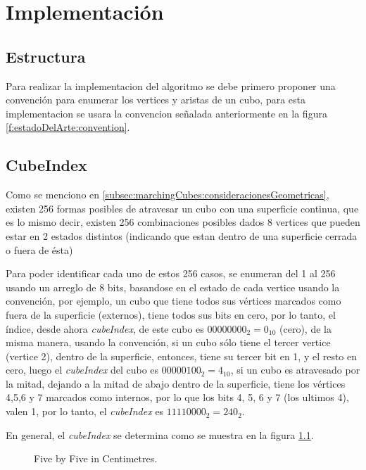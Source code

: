 \chapter{Implementación}
\label{ch:implementacion}

\section{Estructura}
\label{ch:implementacion:sec:estructura}

Para realizar la implementacion del algoritmo se debe primero proponer una convención para enumerar los vertices y aristas de un cubo, para esta implementacion se usara la convencion señalada anteriormente en la figura \ref{f:estadoDelArte:convention}.

\section{CubeIndex}
\label{ch:implementacion:sec:CubeIndex}

Como se menciono en \ref{subsec:marchingCubes:consideracionesGeometricas}, existen 256 formas posibles de atravesar un cubo con una superficie continua, que es lo mismo decir, existen 256 combinaciones posibles dados 8 vertices que pueden estar en 2 estados distintos (indicando que estan dentro de una superficie cerrada o fuera de ésta)

Para poder identificar cada uno de estos 256 casos, se enumeran del 1 al 256 usando un arreglo de 8 bits, basandose en el estado de cada vertice usando la convención, por ejemplo, un cubo que tiene todos sus vértices marcados como fuera de la superficie (externos), tiene todos sus bits en cero, por lo tanto, el índice, desde ahora \emph{cubeIndex}, de este cubo es $0000 0000_{2} = 0_{10}$ (cero), de la misma manera, usando la convención, si un cubo sólo tiene el tercer vertice (vertice 2), dentro de la superficie, entonces, tiene su tercer bit en 1, y el resto en cero, luego el \emph{cubeIndex} del cubo es $0000 0100_{2} = 4_{10}$, si un cubo es atravesado por la mitad, dejando a la mitad de abajo dentro de la superficie, tiene los vértices 4,5,6 y 7 
marcados como internos, por lo que los bits 4, 5, 6 y 7 (los ultimos 4), valen 1, por lo tanto, el \emph{cubeIndex} es $1111 0000_{2} = 240_{2}$.

En general, el \emph{cubeIndex} se determina como se muestra en la figura \ref{f:ch:implementacion:sec:CubeIndex:cubeindex:cubeindex}.

\begin{figure}[hbt]
	\makebox[\textwidth]{\framebox[0.3\textwidth]{\rule{0pt}{0.2\textwidth}}}
	\caption{Five by Five in Centimetres.}
	\label{f:ch:implementacion:sec:CubeIndex:cubeindex:cubeindex}
\end{figure}

